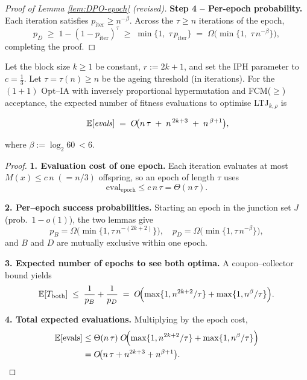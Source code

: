 \documentclass[lettersize,journal]{IEEEtran}
\begin{document}
\begin{proof}[Proof of Lemma \ref{lem:DPO-epoch} (revised)]
	\textbf{Step 4 – Per-epoch probability.}
	Each iteration satisfies \(p_{\text{iter}}\ge n^{-\beta}\).
	Across the \(\tau\ge n\) iterations of the epoch,
	\[
	p_D
	\;\ge\;
	1-(1-p_{\text{iter}})^{\tau}
	\;\ge\;
	\min\!\bigl\{1,\;\tau\,p_{\text{iter}}\bigr\}
	\;=\;
	\Omega\!\bigl(\min\{1,\;\tau\,n^{-\beta}\}\bigr),
	\]
	completing the proof.
\end{proof}

\begin{theorem}
	\label{thm:main-tau-final}
	Let the block size \(k\ge 1\) be constant, \(r:=2k+1\), and set the IPH
	parameter to \(c=\tfrac13\).
	Let \(\tau=\tau(n)\ge n\) be the ageing threshold (in iterations).  
	For the $(1{+}1)$ Opt–IA with inversely proportional hypermutation and
	FCM($\ge$) acceptance, the expected number of fitness evaluations to optimise
	\textsc{LTJ}\(_{k,\rho}\) is
	
	\[
	\;
		\mathbb{E}[\text{\emph{evals}}]
		\;=\;
		O\!\bigl(
		n\,\tau
		\;+\;
		n^{\,2k+3}
		\;+\;
		n^{\,\beta+1}
		\bigr),
	\]
	
	\noindent
	where $\beta:=\log_{2}60\ <6$.
	

\end{theorem}

\begin{proof}
	\textbf{1.  Evaluation cost of one epoch.}
	Each iteration evaluates at most \(M(x)\le c\,n\;(=n/3)\) offspring, so an
	epoch of length \(\tau\) uses
	\[
	\text{eval}_{\text{epoch}}\le c\,n\,\tau=\Theta(n\,\tau).
	\]
	
	\textbf{2.  Per–epoch success probabilities.}
	Starting an epoch in the junction set \(J\) (prob.\ \(1-o(1)\)), the two
	lemmas give
	\[
	p_B=\Omega\!\bigl(\min\{1,\tau\,n^{-(2k+2)}\}\bigr),\quad
	p_D=\Omega\!\bigl(\min\{1,\tau\,n^{-\beta}\}\bigr),
	\]
	and \(B\) and \(D\) are mutually exclusive within one epoch.
	
	\textbf{3.  Expected number of epochs to see both optima.}
	A coupon–collector bound yields
	\[
	\mathbb{E}[T_{\mathrm{both}}]
	\;\le\;
	\frac1{p_B}+\frac1{p_D}
	\;=\;
	O\!\Bigl(
	\max\{1,n^{2k+2}/\tau\}
	+\max\{1,n^{\beta}/\tau\}
	\Bigr).
	\]
	
	\textbf{4.  Total expected evaluations.}
	Multiplying by the epoch cost,
	\begin{align*}
	\mathbb{E}[\text{evals}]
	&\le
	\Theta(n\,\tau)\;
	O\!\Bigl(
	\max\{1,n^{2k+2}/\tau\}
	+\max\{1,n^{\beta}/\tau\}
	\Bigr)
	\\&=
	O\!\bigl(
	n\,\tau
	+n^{2k+3}
	+n^{\beta+1}
	\bigr).
	\end{align*}
\end{proof}
\end{document}
